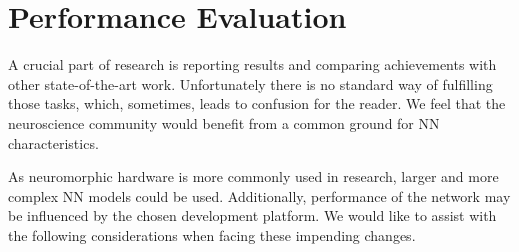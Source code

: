 \section{Performance Evaluation}
\label{sec:eval}

A crucial part of research is reporting results and comparing achievements with other state-of-the-art work. Unfortunately there is no standard way of fulfilling those tasks, which, sometimes, leads to confusion for the reader. We feel that the neuroscience community would benefit from a common ground for NN characteristics.

As neuromorphic hardware is more commonly used in research, larger and more complex NN models could be used. Additionally, performance of the network may be influenced by the chosen development platform. We would like to assist with the following considerations when facing these impending changes.
